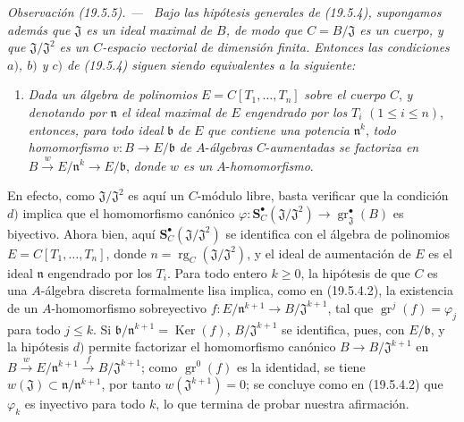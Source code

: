 \documentclass[10pt,oneside]{book}
\makeatletter
\newcommand{\gr}{\operatorname{gr}}
\newcommand{\setmanualcurrentlabel}[1]{\def\@currentlabel{#1}}
\newenvironment{remark}[1][]{%
  \setmanualcurrentlabel{#1}\par\medskip\noindent\itshape Observación (#1). ---\ }{\par}
\makeatother
\begin{document}
\begin{remark}[19.5.5]
\label{0.19.5.5-es}
Bajo las hipótesis generales de (19.5.4), supongamos además que
$\mathfrak J$ es un ideal \emph{maximal} de $B$, de modo que
$C=B/\mathfrak J$ es un cuerpo, y que $\mathfrak J/\mathfrak J^2$ es un
$C$-espacio vectorial de dimensión \emph{finita}. Entonces las condiciones $a)$,
$b)$ y $c)$ de (19.5.4) siguen siendo equivalentes a la siguiente:
\begin{enumerate}
  \item[d)] \emph{Dada un álgebra de polinomios}
  $E=C[T_1,\ldots,T_n]$ \emph{sobre el cuerpo} $C$, \emph{y denotando por}
  $\mathfrak n$ \emph{el ideal maximal de} $E$ \emph{engendrado por los} $T_i$
  $(1\leq i\leq n)$, \emph{entonces, para todo ideal} $\mathfrak b$ \emph{de}
  $E$ \emph{que contiene una potencia} $\mathfrak n^k$, \emph{todo
  homomorfismo} $v:B\to E/\mathfrak b$ \emph{de} $A$-\emph{álgebras}
  $C$-\emph{aumentadas se factoriza en}
  $B\xrightarrow{w}E/\mathfrak n^k\to E/\mathfrak b$, \emph{donde} $w$ \emph{es
  un} $A$-\emph{homomorfismo}.
\end{enumerate}
En efecto, como $\mathfrak J/\mathfrak J^2$ es aquí un $C$-módulo libre, basta
verificar que la condición $d)$ implica que el homomorfismo canónico
$\varphi:\mathbf S_C^\bullet(\mathfrak J/\mathfrak J^2)\to\gr_{\mathfrak J}^\bullet(B)$
es biyectivo. Ahora bien, aquí $\mathbf S_C^\bullet(\mathfrak J/\mathfrak J^2)$ se identifica con
el álgebra de polinomios $E=C[T_1,\ldots,T_n]$, donde
$n=\operatorname{rg}_C(\mathfrak J/\mathfrak J^2)$, y el ideal de aumentación
de $E$ es el ideal $\mathfrak n$ engendrado por los $T_i$. Para todo entero
$k\geq0$, la hipótesis de que $C$ es una $A$-álgebra discreta formalmente lisa
implica, como en (19.5.4.2), la existencia de un $A$-homomorfismo sobreyectivo
$f:E/\mathfrak n^{k+1}\to B/\mathfrak J^{k+1}$, tal que
$\gr^j(f)=\varphi_j$ para todo $j\leq k$. Si
$\mathfrak b/\mathfrak n^{k+1}=\operatorname{Ker}(f)$,
$B/\mathfrak J^{k+1}$ se identifica, pues, con $E/\mathfrak b$, y la hipótesis $d)$
permite factorizar el homomorfismo canónico $B\to B/\mathfrak J^{k+1}$ en
$B\xrightarrow{w}E/\mathfrak n^{k+1}\xrightarrow{f}B/\mathfrak J^{k+1}$;
como $\gr^0(f)$ es la identidad, se tiene
$w(\mathfrak J)\subset\mathfrak n/\mathfrak n^{k+1}$, por tanto
$w(\mathfrak J^{k+1})=0$; se concluye como en (19.5.4.2) que $\varphi_k$
es inyectivo para todo $k$, lo que termina de probar nuestra afirmación.
\end{remark}
\end{document}

